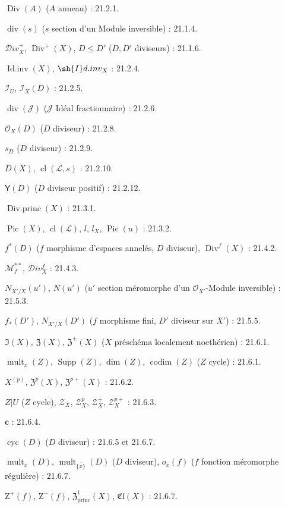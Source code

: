 $\operatorname{Div}(A)$ ($A$ anneau) : 21.2.1.

$\operatorname{div}(s)$ ($s$ section d'un Module inversible) : 21.1.4.

$\mathcal{D}iv_X^+$, $\operatorname{Div}^+(X)$, $D\leq D'$
($D,D'$ diviseurs) : 21.1.6.

$\operatorname{Id.inv}(X)$, $\sh{I}d.inv_X$ : 21.2.4.

$\mathcal I_U$, $\mathcal I_X(D)$ : 21.2.5.

$\operatorname{div}(\mathcal J)$ ($\mathcal J$ Idéal fractionnaire) : 21.2.6.

$\mathcal O_X(D)$ ($D$ diviseur) : 21.2.8.

$s_D$ ($D$ diviseur) : 21.2.9.

$D(X)$, $\operatorname{cl}(\mathcal L,s)$ : 21.2.10.

$\boldsymbol{\mathsf{Y}}(D)$ ($D$ diviseur positif) : 21.2.12.

$\operatorname{Div.princ}(X)$ : 21.3.1.

$\operatorname{Pic}(X)$, $\operatorname{cl}(\mathcal L)$, $l$, $l_X$,
$\operatorname{Pic}(u)$ : 21.3.2.

$f^*(D)$ ($f$ morphisme d'espaces annelés, $D$ diviseur),
$\operatorname{Div}^f(X)$ : 21.4.2.

$\mathcal M_f^{**}$, $\mathcal{D}iv_X^f$ : 21.4.3.

$N_{X'/X}(u')$, $N(u')$
($u'$ section méromorphe d'un $\mathcal O_{X'}$-Module inversible) : 21.5.3.

$f_*(D')$, $N_{X'/X}(D')$
($f$ morphisme fini, $D'$ diviseur sur $X'$) : 21.5.5.

$\mathfrak I(X)$, $\mathfrak Z(X)$, $\mathfrak Z^+(X)$
($X$ préschéma localement noethérien) : 21.6.1.

$\operatorname{mult}_x(Z)$, $\operatorname{Supp}(Z)$,
$\dim(Z)$, $\operatorname{codim}(Z)$ ($Z$ cycle) : 21.6.1.

$X^{(p)}$, $\mathfrak Z^p(X)$, $\mathfrak Z^{p+}(X)$ : 21.6.2.

$Z|U$ ($Z$ cycle), $\mathscr Z_X$, $\mathscr Z_X^p$,
$\mathscr Z_X^+$, $\mathscr Z_X^{p+}$ : 21.6.3.

$\boldsymbol{c}$ : 21.6.4.

$\operatorname{cyc}(D)$ ($D$ diviseur) : 21.6.5 et 21.6.7.

$\operatorname{mult}_x(D)$, $\operatorname{mult}_{\overline{\{x\}}}(D)$
($D$ diviseur), $o_x(f)$ ($f$ fonction méromorphe régulière) : 21.6.7.

$\mathrm Z^+(f)$, $\mathrm Z^-(f)$, $\mathfrak Z^1_{\mathrm{princ}}(X)$,
$\mathfrak{Cl}(X)$ : 21.6.7.

